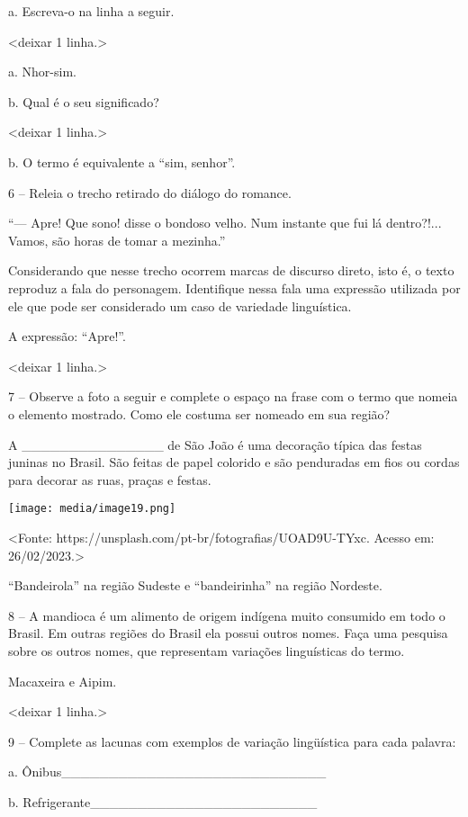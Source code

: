 a. Escreva-o na linha a seguir.

\textless{}deixar 1 linha.\textgreater{}

a. Nhor-sim.

b. Qual é o seu significado?

\textless{}deixar 1 linha.\textgreater{}

b. O termo é equivalente a ``sim, senhor''.

6 -- Releia o trecho retirado do diálogo do romance.

``--- Apre! Que sono! disse o bondoso velho. Num instante que fui lá
dentro?!... Vamos, são horas de tomar a mezinha.''

Considerando que nesse trecho ocorrem marcas de discurso direto, isto é,
o texto reproduz a fala do personagem. Identifique nessa fala uma
expressão utilizada por ele que pode ser considerado um caso de
variedade linguística.

A expressão: ``Apre!''.

\textless{}deixar 1 linha.\textgreater{}

7 -- Observe a foto a seguir e complete o espaço na frase com o termo
que nomeia o elemento mostrado. Como ele costuma ser nomeado em sua
região?

A \_\_\_\_\_\_\_\_\_\_\_\_\_\_\_ de São João é uma decoração típica das
festas juninas no Brasil. São feitas de papel colorido e são penduradas
em fios ou cordas para decorar as ruas, praças e festas.

\texttt{[image: media/image19.png]}

\textless{}Fonte: https://unsplash.com/pt-br/fotografias/UOAD9U-TYxc.
Acesso em: 26/02/2023.\textgreater{}

``Bandeirola'' na região Sudeste e ``bandeirinha'' na região Nordeste.

8 -- A mandioca é um alimento de origem indígena muito consumido em todo
o Brasil. Em outras regiões do Brasil ela possui outros nomes. Faça uma
pesquisa sobre os outros nomes, que representam variações linguísticas
do termo.

Macaxeira e Aipim.

\textless{}deixar 1 linha.\textgreater{}

9 -- Complete as lacunas com exemplos de variação lingüística para cada
palavra:

a. Ônibus\_\_\_\_\_\_\_\_\_\_\_\_\_\_\_\_\_\_\_\_\_\_\_\_\_\_\_\_

b. Refrigerante\_\_\_\_\_\_\_\_\_\_\_\_\_\_\_\_\_\_\_\_\_\_\_\_

